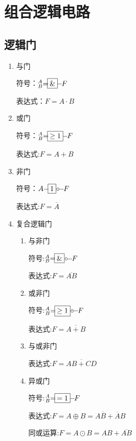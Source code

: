 \chapter{组合逻辑电路}
\newpage

\section{逻辑门}

\begin{enumerate}

\item 与门

符号：$^A_B{\large=}\!\boxed{\&}\!\!-\!\!{\small F}$

表达式：$F=A \cdot B$

\item 或门

符号：$^A_B{\large=}\!\boxed{\geq{1}}\!\!-\!\!{\small F}$

表达式:$F=A+B$

\item 非门

符号：$A{\large-}\!\boxed{1}{\normalsize\circ}\!\!-\!\!{\small F}$

表达式:$F=\overline A$

\item 复合逻辑门

\begin{enumerate}

    \item 与非门

          符号:$^A_B{\large=}\!\boxed{\&}{\normalsize\circ} \!\!-\!\!{\small F}$

          表达式:$F=\overline{AB}$

    \item 或非门

          符号:$^A_B{\large=}\!\boxed{\geq{1}}{\normalsize\circ} \!\!-\!\!{\small F}$

          表达式:$F=\overline{A+B}$

    \item 与或非门

          表达式:$F=\overline{AB+CD}$

    \item 异或门

          符号:$^A_B{\large=}\!\boxed{={1}} \!\!-\!\!{\small F}$

          表达式:$F=A\oplus{}B=A\overline{B}+\overline{A}B$

          同或运算:$F=A\odot{}B=AB+\overline{AB}$


\end{enumerate}
\end{enumerate}
